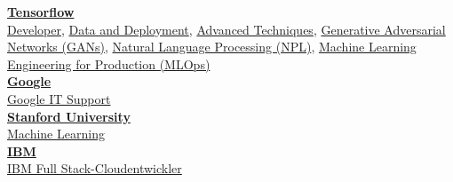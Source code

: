 \documentclass{article}
\begin{document}
\begin{minipage}{0.25\textwidth}
\begin{center}
	\centering
	\vspace{-2mm}
	\textbf{\color{pblue}\underline{Tensorflow}}\\
	\href{https://www.coursera.org/account/accomplishments/specialization/certificate/WNXPGV8FR3AF}{\color{pblue}Developer},
	\href{https://www.coursera.org/account/accomplishments/specialization/certificate/R4LSQ7AK8M83}{\color{pblue}Data and Deployment},
	\href{https://www.coursera.org/account/accomplishments/specialization/certificate/5DDY3GKK3YTV}{\color{pblue}Advanced Techniques},
	\href{https://www.coursera.org/account/accomplishments/specialization/certificate/KA3YGBWN8RM2}{\color{pblue}Generative Adversarial Networks (GANs)},
	\href{https://www.coursera.org/account/accomplishments/certificate/JKHKJWYFUT43}{\color{pblue}Natural Language Processing (NPL)},
	\href{https://www.coursera.org/account/accomplishments/specialization/certificate/SCJJ3AWTKR4B}{\color{pblue}Machine Learning Engineering for Production (MLOps)}\\
	
	\textbf{\color{pblue}\underline{Google}}\\
	\href{https://www.coursera.org/account/accomplishments/specialization/certificate/U9C59W5MS826}{\color{pblue}Google IT Support}\\
	
	\textbf{\color{pblue}\underline{Stanford University}}\\
	\href{https://www.coursera.org/api/legacyCertificates.v1/spark/statementOfAccomplishment/972304~5332413/pdf}{\color{pblue}Machine Learning}\\
	
	\textbf{\color{pblue}\underline{IBM}}\\
	\href{https://www.coursera.org/account/accomplishments/certificate/JNSWNP2SMB6A}{\color{pblue}IBM Full Stack-Cloudentwickler}


\end{center}
\end{minipage}
\end{document}
